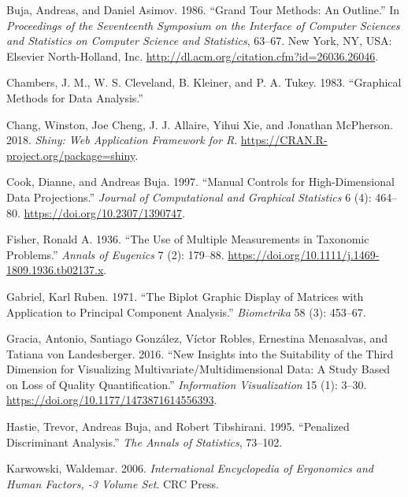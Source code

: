 \documentclass[
  11,
]{article}
\begin{document}
\leavevmode\hypertarget{ref-buja_grand_1986}{}%
Buja, Andreas, and Daniel Asimov. 1986. ``Grand Tour Methods: An Outline.'' In \emph{Proceedings of the Seventeenth Symposium on the Interface of Computer Sciences and Statistics on Computer Science and Statistics}, 63--67. New York, NY, USA: Elsevier North-Holland, Inc. \url{http://dl.acm.org/citation.cfm?id=26036.26046}.

\leavevmode\hypertarget{ref-chambers_graphical_1983}{}%
Chambers, J. M., W. S. Cleveland, B. Kleiner, and P. A. Tukey. 1983. ``Graphical Methods for Data Analysis.''

\leavevmode\hypertarget{ref-chang_shiny:_2018}{}%
Chang, Winston, Joe Cheng, J. J. Allaire, Yihui Xie, and Jonathan McPherson. 2018. \emph{Shiny: Web Application Framework for R}. \url{https://CRAN.R-project.org/package=shiny}.

\leavevmode\hypertarget{ref-cook_manual_1997}{}%
Cook, Dianne, and Andreas Buja. 1997. ``Manual Controls for High-Dimensional Data Projections.'' \emph{Journal of Computational and Graphical Statistics} 6 (4): 464--80. \url{https://doi.org/10.2307/1390747}.

\leavevmode\hypertarget{ref-fisher_use_1936}{}%
Fisher, Ronald A. 1936. ``The Use of Multiple Measurements in Taxonomic Problems.'' \emph{Annals of Eugenics} 7 (2): 179--88. \url{https://doi.org/10.1111/j.1469-1809.1936.tb02137.x}.

\leavevmode\hypertarget{ref-gabriel_biplot_1971}{}%
Gabriel, Karl Ruben. 1971. ``The Biplot Graphic Display of Matrices with Application to Principal Component Analysis.'' \emph{Biometrika} 58 (3): 453--67.

\leavevmode\hypertarget{ref-gracia_new_2016}{}%
Gracia, Antonio, Santiago González, Víctor Robles, Ernestina Menasalvas, and Tatiana von Landesberger. 2016. ``New Insights into the Suitability of the Third Dimension for Visualizing Multivariate/Multidimensional Data: A Study Based on Loss of Quality Quantification.'' \emph{Information Visualization} 15 (1): 3--30. \url{https://doi.org/10.1177/1473871614556393}.

\leavevmode\hypertarget{ref-hastie_penalized_1995}{}%
Hastie, Trevor, Andreas Buja, and Robert Tibshirani. 1995. ``Penalized Discriminant Analysis.'' \emph{The Annals of Statistics}, 73--102.

\leavevmode\hypertarget{ref-karwowski_international_2006}{}%
Karwowski, Waldemar. 2006. \emph{International Encyclopedia of Ergonomics and Human Factors, -3 Volume Set}. CRC Press.
\end{document}
